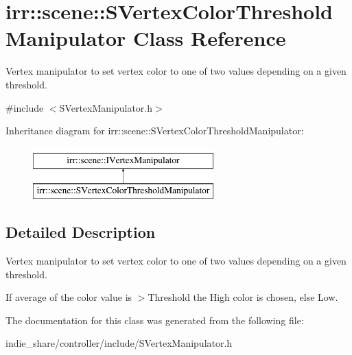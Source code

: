 \hypertarget{classirr_1_1scene_1_1SVertexColorThresholdManipulator}{}\section{irr\+:\+:scene\+:\+:S\+Vertex\+Color\+Threshold\+Manipulator Class Reference}
\label{classirr_1_1scene_1_1SVertexColorThresholdManipulator}


Vertex manipulator to set vertex color to one of two values depending on a given threshold.  




{\ttfamily \#include $<$S\+Vertex\+Manipulator.\+h$>$}

Inheritance diagram for irr\+:\+:scene\+:\+:S\+Vertex\+Color\+Threshold\+Manipulator\+:\begin{figure}[H]
\begin{center}
\leavevmode
\includegraphics[height=2.000000cm]{classirr_1_1scene_1_1SVertexColorThresholdManipulator}
\end{center}
\end{figure}


\subsection{Detailed Description}
Vertex manipulator to set vertex color to one of two values depending on a given threshold. 

If average of the color value is $>$Threshold the High color is chosen, else Low. 

The documentation for this class was generated from the following file\+:\begin{DoxyCompactItemize}
\item 
indie\+\_\+share/controller/include/S\+Vertex\+Manipulator.\+h\end{DoxyCompactItemize}
